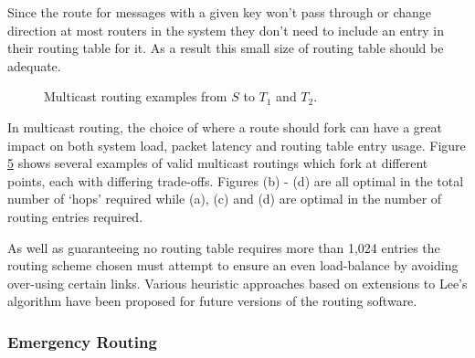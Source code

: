 				Since the route for messages with a given key won't pass through or
				change direction at most routers in the system they don't need to
				include an entry in their routing table for it. As a result this small
				size of routing table should be adequate.
				
				\begin{figure}
					\begin{subfigure}[b]{0.24\textwidth}
						\center
						
						\caption{}
						\label{fig:multicast-routing-a}
					\end{subfigure}
					\begin{subfigure}[b]{0.24\textwidth}
						\center
						
						\caption{}
						\label{fig:multicast-routing-b}
					\end{subfigure}
					\begin{subfigure}[b]{0.24\textwidth}
						\center
						
						\caption{}
						\label{fig:multicast-routing-c}
					\end{subfigure}
					\begin{subfigure}[b]{0.24\textwidth}
						\center
						
						\caption{}
						\label{fig:multicast-routing-d}
					\end{subfigure}
					\caption[Multicast routing examples.]{Multicast routing examples from
					$S$ to $T_1$ and $T_2$.}
					\label{fig:multicast-routing}
				\end{figure}
				
				In multicast routing, the choice of where a route should fork can have a
				great impact on both system load, packet latency and routing table entry
				usage. Figure \ref{fig:multicast-routing} shows several examples of
				valid multicast routings which fork at different points, each with
				differing trade-offs. Figures (b) - (d) are all optimal in the total
				number of `hops' required while (a), (c) and (d) are optimal in the
				number of routing entries required.
				
				As well as guaranteeing no routing table requires more than 1,024
				entries the routing scheme chosen must attempt to ensure an even
				load-balance by avoiding over-using certain links. Various heuristic
				approaches based on extensions to Lee's algorithm have been proposed for
				future versions of the routing software\cite{davidson13}.
			
			\subsubsection{Emergency Routing}
				
